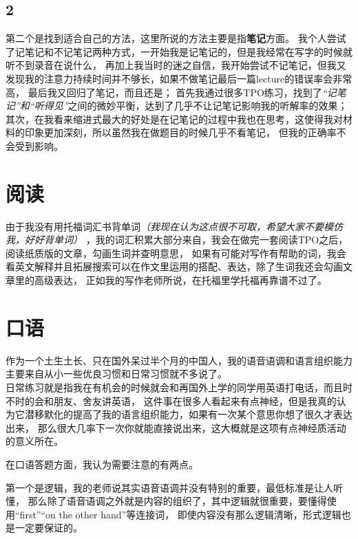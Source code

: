 \documentclass[blue,pad,cn]{elegantnote}
\begin{document}
\subsection{2}
    第二个是找到适合自己的方法，这里所说的方法主要是指\textbf{笔记}方面。
    我个人尝试了记笔记和不记笔记两种方式，一开始我是记笔记的，但是我经常在写字的时候就听不到录音在说什么，
    再加上我当时的迷之自信，我开始尝试不记笔记，但我又发现我的注意力持续时间并不够长，如果不做笔记最后一篇lecture的错误率会非常高，
    最后我又回归了笔记，{\small}而且还是{}；
    首先我通过很多TPO练习，找到了\textit{“记笔记”和“听得见”}之间的微妙平衡，达到了几乎不让记笔记影响我的听解率的效果；
    其次，在我看来缩进式最大的好处是在记笔记的过程中我也在思考，这使得我对材料的印象更加深刻，所以虽然我在做题目的时候几乎不看笔记，
    但我的正确率不会受到影响。

\section{阅读}

    由于我没有用托福词汇书背单词\textsl{（我现在认为这点很不可取，希望大家不要模仿我，好好背单词）}
    ，我的词汇积累大部分来自{}，我会在做完一套阅读TPO之后，阅读纸质版的文章，勾画生词并查明意思，
    如果有可能对写作有帮助的词，我会看英文解释并且拓展搜索可以在作文里运用的搭配、表达，除了生词我还会勾画文章里的高级表达，
    正如我的写作老师所说，在托福里学托福再靠谱不过了。

\section{口语}
    作为一个土生土长、只在国外呆过半个月的中国人，我的语音语调和语言组织能力主要来自从小一些优良习惯和日常习惯就不多说了。\\
    日常练习就是指我在有机会的时候就会和再国外上学的同学用英语打电话，\hspace{2.5cm}而且时不时的会和朋友、舍友讲英语，
    这件事在很多人看起来有点神经，但是我真的认为它潜移默化的提高了我的语言组织能力，如果有一次某个意思你想了很久才表达出来，
    那么很大几率下一次你就能直接说出来，这大概就是这项有点神经质活动的意义所在。


    在口语答题方面，我认为需要注意的有两点。
\begin{remark}
    第一个是逻辑，我的老师说其实语音语调并没有特别的重要，最低标准是让人听懂，
    那么除了语音语调之外就是内容的组织了，其中逻辑就很重要，要懂得使用“first”“on the other hand”等连接词，
    即使内容没有那么逻辑清晰，形式逻辑也是一定要保证的。
\end{remark}
\end{document}
